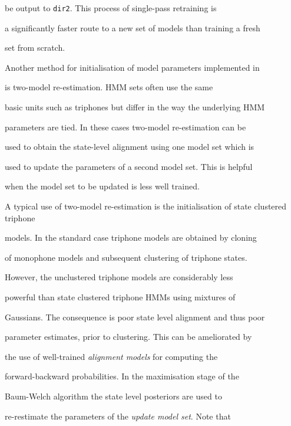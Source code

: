 be output to \texttt{dir2}. This process of single-pass retraining is


a significantly faster route to a new set of models than training a fresh 


set from scratch.










Another method for initialisation of model parameters implemented in


 is two-model re-estimation. HMM sets often use the same


basic units such as triphones but differ in the way the underlying HMM


parameters are tied. In these cases two-model re-estimation can be


used to obtain the state-level alignment using one model set which is


used to update the parameters of a second model set. This is helpful


when the model set to be updated is less well trained.





A typical use of two-model re-estimation is the initialisation of state clustered triphone


models. In the standard case triphone models are obtained by cloning


of monophone models and subsequent clustering of triphone states.


However, the unclustered triphone models are considerably less


powerful than state clustered triphone HMMs using mixtures of


Gaussians. The consequence is poor state level alignment and thus poor


parameter estimates, prior to clustering.  This can be ameliorated by


the use of well-trained \textit{alignment models} for computing the


forward-backward probabilities. In the maximisation stage of the


Baum-Welch algorithm the state level posteriors are used to


re-restimate the parameters of the \textit{update model set}. Note that



